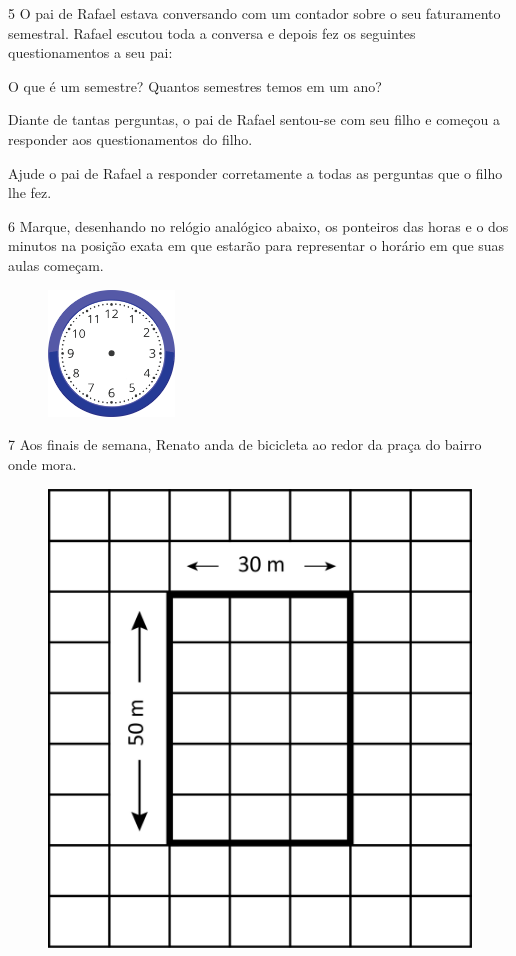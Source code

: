 \num{5} O pai de Rafael estava conversando com um contador sobre o seu
faturamento semestral. Rafael escutou toda a conversa e depois fez os
seguintes questionamentos a seu pai:

O que é um semestre? 
Quantos semestres temos em um ano?

Diante de tantas perguntas, o pai de Rafael sentou-se com seu filho e
começou a responder aos questionamentos do filho.

Ajude o pai de Rafael a responder corretamente a todas as perguntas que o filho lhe fez.

\num{6} Marque, desenhando no relógio analógico abaixo, os ponteiros das horas e o dos
minutos na posição exata em que estarão para representar o horário em que
suas aulas começam.

\begin{figure}[htpb!]
\centering
\includegraphics[width=0.3\textwidth]{./media/image54b.png}
\end{figure}


\pagebreak

\num{7} Aos finais de semana, Renato anda de bicicleta ao redor da praça do bairro onde mora.

\begin{figure}[htpb!]
\centering
\includegraphics[width=.4\textwidth]{./media/image55.png}
\end{figure}

